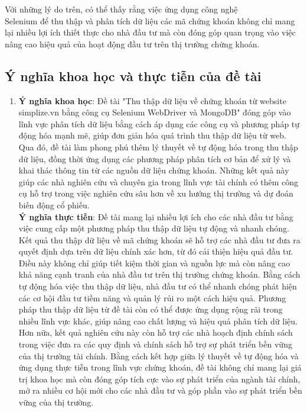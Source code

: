 \begin{enumerate}
\begin{itemize}[left=0.5cm]
         \end{itemize}
        \hspace*{0.7cm}Với những lý do trên, có thể thấy rằng việc ứng dụng công nghệ \\Selenium để thu thập và phân tích dữ liệu các mã chứng khoán không chỉ mang lại nhiều lợi ích thiết thực cho nhà đầu tư mà còn đóng góp quan trọng vào việc nâng cao hiệu quả của hoạt động đầu tư trên thị trường chứng khoán.
        
\end{enumerate}

\subsection{Ý nghĩa khoa học và thực tiễn của đề tài}
\begin{enumerate}
	\item [] 
            \hspace*{0.7cm} \textbf{Ý nghĩa khoa học}: Đề tài "Thu thập dữ liệu về chứng khoán từ website simplize.vn bằng công cụ Selenium WebDriver và MongoDB" đóng góp vào lĩnh vực phân tích dữ liệu bằng cách áp dụng các công cụ và phương pháp tự động hóa mạnh mẽ, giúp đơn giản hóa quá trình thu thập dữ liệu từ web. Qua đó, đề tài làm phong phú thêm lý thuyết về tự động hóa trong thu thập dữ liệu, đồng thời ứng dụng các phương pháp phân tích cơ bản để xử lý và khai thác thông tin từ các nguồn dữ liệu chứng khoán. Những kết quả này giúp các nhà nghiên cứu và chuyên gia trong lĩnh vực tài chính có thêm công cụ hỗ trợ trong việc nghiên cứu sâu hơn về xu hướng thị trường và dự đoán biến động cổ phiếu.\\
            
            \hspace*{0.7cm}\textbf{Ý nghĩa thực tiễn}: Đề tài mang lại nhiều lợi ích cho các nhà đầu tư bằng việc cung cấp một phương pháp thu thập dữ liệu tự động và nhanh chóng. Kết quả thu thập dữ liệu về mã chứng khoán sẽ hỗ trợ các nhà đầu tư đưa ra quyết định dựa trên dữ liệu chính xác hơn, từ đó cải thiện hiệu quả đầu tư. Điều này không chỉ giúp tiết kiệm thời gian và nguồn lực mà còn nâng cao khả năng cạnh tranh của nhà đầu tư trên thị trường chứng khoán. Bằng cách tự động hóa việc thu thập dữ liệu, nhà đầu tư có thể nhanh chóng phát hiện các cơ hội đầu tư tiềm năng và quản lý rủi ro một cách hiệu quả. Phương pháp thu thập dữ liệu từ đề tài còn có thể được ứng dụng rộng rãi trong nhiều lĩnh vực khác, giúp nâng cao chất lượng và hiệu quả phân tích dữ liệu.\\
            
            \hspace*{0.7cm}Hơn nữa, kết quả nghiên cứu này còn hỗ trợ các nhà hoạch định chính sách trong việc đưa ra các quy định và chính sách hỗ trợ sự phát triển bền vững của thị trường tài chính. Bằng cách kết hợp giữa lý thuyết về tự động hóa và ứng dụng thực tiễn trong lĩnh vực chứng khoán, đề tài không chỉ mang lại giá trị khoa học mà còn đóng góp tích cực vào sự phát triển của ngành tài chính, mở ra nhiều cơ hội mới cho các nhà đầu tư và góp phần vào sự phát triển bền vững của thị trường.
\end{enumerate}


